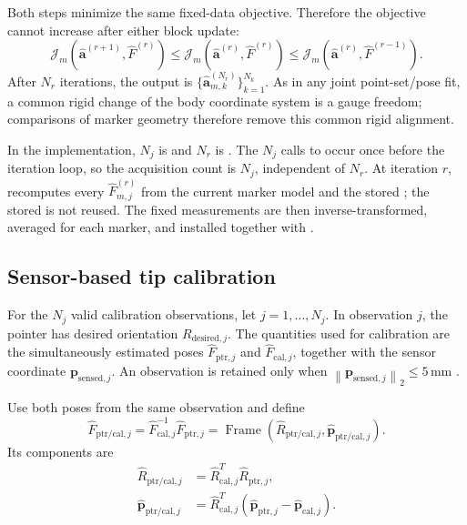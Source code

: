\documentclass[11pt]{article}
\newcommand{\vct}[1]{\bm{#1}}
\newcommand{\Frame}{\operatorname{Frame}}
\newcommand{\norm}[1]{\left\|#1\right\|_2}
\begin{document}
Both steps minimize the same fixed-data objective.  Therefore the objective
cannot increase after either block update:
\begin{equation}
\mathcal J_m(\widehat{\vct{a}}^{(r+1)},\widehat F^{(r)})
\leq
\mathcal J_m(\widehat{\vct{a}}^{(r)},\widehat F^{(r)})
\leq
\mathcal J_m(\widehat{\vct{a}}^{(r)},\widehat F^{(r-1)}).
\end{equation}
After $N_r$ iterations, the output is
$\{\widehat{\vct{a}}_{m,k}^{(N_r)}\}_{k=1}^{N_k}$.  As in any joint
point-set/pose fit, a common rigid change of the body coordinate system is a
gauge freedom; comparisons of marker geometry therefore remove this common
rigid alignment.

In the implementation, $N_j$ is  and $N_r$ is
.  The $N_j$ calls to
 occur once before the iteration loop,
so the acquisition count is $N_j$, independent of $N_r$.  At iteration $r$,
 recomputes every
$\widehat F_{m,j}^{(r)}$ from the current marker model and the stored
; the stored  is not reused.  The
fixed measurements are then inverse-transformed, averaged for each marker,
and installed together with 
\cite{assignment,repo}.

\subsection{Sensor-based tip calibration}
For the $N_j$ valid calibration observations, let
$j=1,\ldots,N_j$. In observation $j$, the pointer has desired orientation
$R_{\mathrm{desired},j}$. The quantities used for calibration are the
simultaneously estimated poses $\widehat F_{\mathrm{ptr},j}$ and
$\widehat F_{\mathrm{cal},j}$, together with the sensor coordinate
$\vct{p}_{\mathrm{sensed},j}$. An observation is retained only when
$\norm{\vct{p}_{\mathrm{sensed},j}}\leq 5\,\mathrm{mm}$ \cite{assignment}.

Use both poses from the same observation and define
\begin{equation}
\widehat F_{\mathrm{ptr/cal},j}=\widehat F_{\mathrm{cal},j}^{-1}\widehat F_{\mathrm{ptr},j}
=\Frame(\widehat R_{\mathrm{ptr/cal},j},\widehat{\vct{p}}_{\mathrm{ptr/cal},j}).
\end{equation}
Its components are
\begin{align}
\widehat R_{\mathrm{ptr/cal},j}
&=\widehat R_{\mathrm{cal},j}^T\widehat R_{\mathrm{ptr},j},\\
\widehat{\vct{p}}_{\mathrm{ptr/cal},j}
&=\widehat R_{\mathrm{cal},j}^T
(\widehat{\vct{p}}_{\mathrm{ptr},j}-\widehat{\vct{p}}_{\mathrm{cal},j}).
\end{align}
\end{document}
